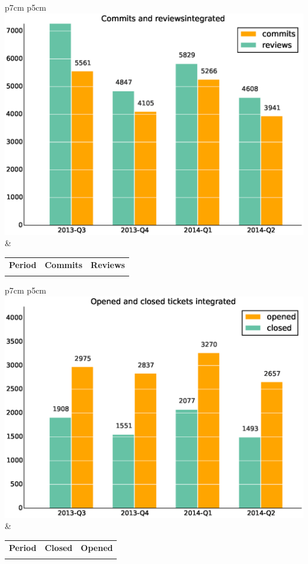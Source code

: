 \documentclass[a4wide,11pt]{report}
\begin{document}
\begin{tabular}{p{7cm} p{5cm}}
    \vspace{0pt} 
    \includegraphics[scale=.35]{figs/commitsintegrated.eps}
    & 
    \vspace{0pt}
    \begin{tabular}{l|r|r|}%
    \bfseries Period & \bfseries Commits & \bfseries Reviews%
    \csvreader[head to column names]{data/commitsintegrated.csv}{}%
    {\\ & \commits & \submitted}
    \end{tabular}
\end{tabular}

\begin{tabular}{p{7cm} p{5cm}}
    \vspace{0pt} 
    \includegraphics[scale=.35]{figs/closedintegrated.eps}
    & 
    \vspace{0pt}
    \begin{tabular}{l|r|r|}%
    \bfseries Period & \bfseries Closed & \bfseries Opened%
    \csvreader[head to column names]{data/closedintegrated.csv}{}%
    {\\ & \closed & \opened}
    \end{tabular}
\end{tabular}
\end{document}
